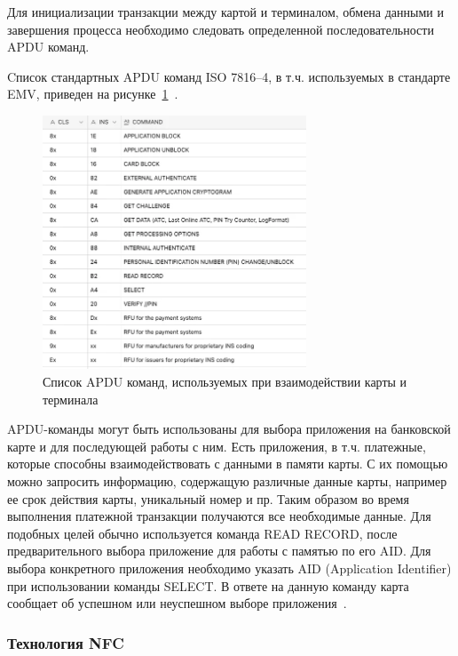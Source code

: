 Для инициализации транзакции между картой и терминалом, обмена данными и завершения процесса необходимо следовать определенной последовательности APDU команд.

Cписок стандартных APDU команд ISO 7816--4, в т.ч. используемых в стандарте EMV, приведен на рисунке~\ref{fig:apdu_commands}~\cite{iso7816-4}.

\begin{figure}[H]
    \centering
    \includegraphics[width=0.7\textwidth]{images/research/apdu_commands}
    \caption{\centering Список APDU команд, используемых при взаимодействии карты и терминала}
    \label{fig:apdu_commands}
\end{figure}

APDU-команды могут быть использованы для выбора приложения на банковской карте и для последующей работы с ним.
Есть приложения, в т.ч. платежные, которые способны взаимодействовать с данными в памяти карты.
С их помощью можно запросить информацию, содержащую различные данные карты, например ее срок действия карты, уникальный номер и пр.
Таким образом во время выполнения платежной транзакции получаются все необходимые данные.
Для подобных целей обычно используется команда READ RECORD, после предварительного выбора приложение для работы с памятью по его AID.
Для выбора конкретного приложения необходимо указать AID (Application Identifier) при использовании команды SELECT.
В ответе на данную команду карта сообщает об успешном или неуспешном выборе приложения~\cite{medium_apdu2_1}.


\subsubsection{Технология NFC}

